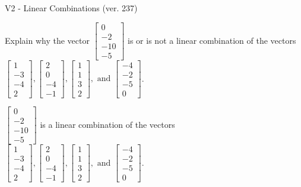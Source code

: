 \begin{exercise}
  \begin{exerciseTitle}V2 - Linear Combinations (ver. 237)\end{exerciseTitle}
  \begin{exerciseStatement}
    Explain why the vector \(\left[\begin{array}{c}
0 \\
-2 \\
-10 \\
-5
\end{array}\right]\)  is or is not a linear 
	combination of the vectors \(\left[\begin{array}{c}
1 \\
-3 \\
-4 \\
2
\end{array}\right] , \left[\begin{array}{c}
2 \\
0 \\
-4 \\
-1
\end{array}\right] , \left[\begin{array}{c}
1 \\
1 \\
3 \\
2
\end{array}\right] , \text{ and } \left[\begin{array}{c}
-4 \\
-2 \\
-5 \\
0
\end{array}\right]\).
	


  \end{exerciseStatement}
  \begin{exerciseAnswer}
   \(\left[\begin{array}{c}
0 \\
-2 \\
-10 \\
-5
\end{array}\right]\) 
  	 is  
	a linear combination of the vectors \(\left[\begin{array}{c}
1 \\
-3 \\
-4 \\
2
\end{array}\right] , \left[\begin{array}{c}
2 \\
0 \\
-4 \\
-1
\end{array}\right] , \left[\begin{array}{c}
1 \\
1 \\
3 \\
2
\end{array}\right] , \text{ and } \left[\begin{array}{c}
-4 \\
-2 \\
-5 \\
0
\end{array}\right]\).


\end{exerciseAnswer}
\end{exercise}

